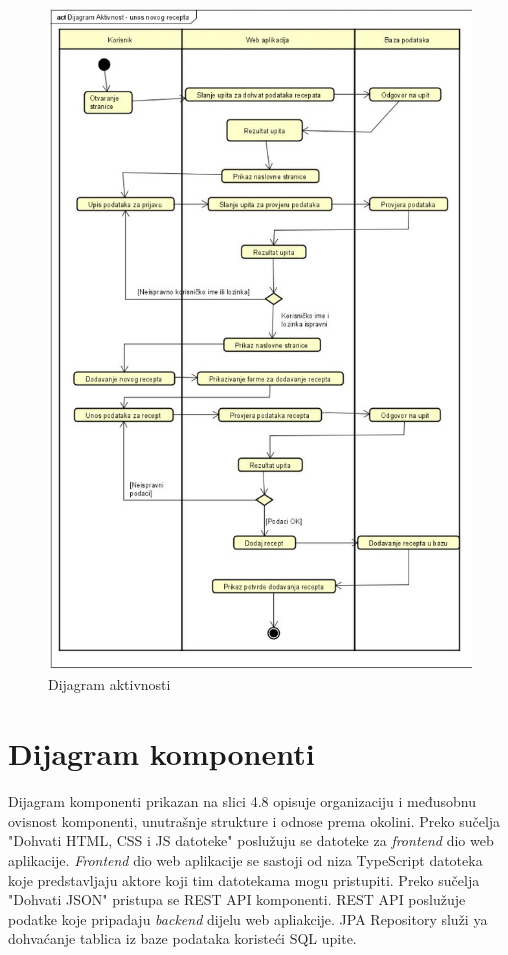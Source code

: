 \begin{figure}[H]
	\includegraphics[scale=0.6]{slike/ActivityD.PNG} %
	\centering
	\caption{Dijagram aktivnosti}
	\label{fig:promjene}
\end{figure}

\eject
\section{Dijagram komponenti}

\text\noindent
Dijagram komponenti prikazan na slici 4.8 opisuje organizaciju i međusobnu ovisnost komponenti, unutrašnje strukture i odnose prema okolini.
Preko sučelja "Dohvati HTML, CSS i JS datoteke" poslužuju se datoteke za \textit{frontend} dio web aplikacije.
\textit{Frontend} dio web aplikacije se sastoji od niza TypeScript datoteka koje predstavljaju aktore koji tim datotekama mogu pristupiti.
Preko sučelja "Dohvati JSON" pristupa se REST API komponenti. REST API poslužuje podatke koje pripadaju \textit{backend} dijelu web apliakcije.
JPA Repository služi ya dohvaćanje tablica iz baze podataka koristeći SQL upite. 

